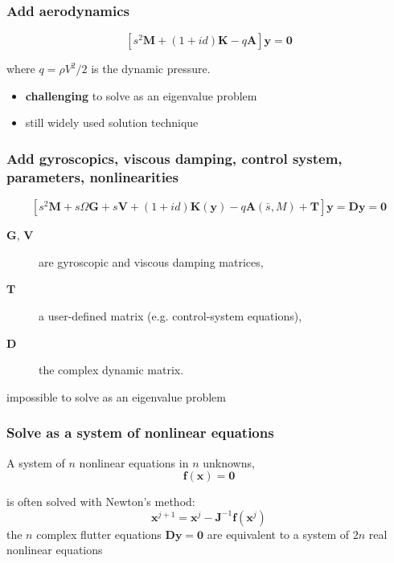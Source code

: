 \documentclass{beamer}
\newcommand{\Matrix}[1]{\boldsymbol{#1}}
\newcommand{\Vector}[1]{\boldsymbol{#1}}
\begin{document}
\begin{frame}
	\frametitle{Add aerodynamics}
	\begin{equation}\label{eqn:sdamp}
		\left[ s^2 \Matrix{M} + (1+id)\Matrix{K} -q\Matrix{A}\right]\Vector{y} = \Vector{0} \nonumber
	\end{equation}

	\vspace{5mm}
	where $q = \rho V^2/2$ is the dynamic pressure.

	\vspace{5mm}
	\begin{itemize}
		\item {\bf challenging} to solve as an eigenvalue problem
		\item still widely used solution technique
	\end{itemize}
\end{frame}

\begin{frame}
	\frametitle{Add gyroscopics, viscous damping, control system, parameters, nonlinearities}
	\begin{equation}\label{eqn:flut}
		\left[ s^2 \Matrix{M} + s \Omega\Matrix{G} + s \Matrix{V} +
		 (1 + id) \Matrix{K}(\Vector{y}) - q \Matrix{A} (\bar{s},M) + \Matrix{T} \right]
		  \Vector{y} = \Matrix{D}\Vector{y} =
		  \Vector{0} \nonumber
		\end{equation}

	\begin{description}
		\item[$\Matrix{G}$, $\Matrix{V}$] are gyroscopic and viscous damping matrices,
		\item[$\Matrix{T}$] a user-defined matrix (e.g. control-system equations),
		\item[$\Matrix{D}$] the complex dynamic matrix.
	\end{description}

	\vspace{5mm}
	impossible to solve as an eigenvalue problem
\end{frame}

\begin{frame}
	\frametitle{Solve as a system of nonlinear equations}
	A system of $n$ nonlinear equations in $n$ unknowns,
	\begin{equation}
		\Vector{f}(\Vector{x}) = \Vector{0}	\nonumber
	\end{equation}

	\vspace{5mm}
	is often solved with Newton's method:
	\begin{equation}
		\Vector{x}^{j+1} = \Vector{x}^{j} - \Matrix{J}^{-1}\Vector{f}(\Vector{x}^{j})	\nonumber
	\end{equation}
	\vspace{5mm}
	the $n$ complex flutter equations $\Matrix{D}\Vector{y} = \Vector{0}$ are equivalent to a system of
	$2n$ real nonlinear equations
\end{frame}
\end{document}
